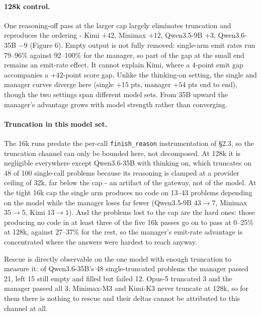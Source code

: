 \documentclass[11pt]{article}
\begin{document}


\paragraph{128k control.}
One reasoning-off pass at the larger cap largely eliminates truncation and reproduces the
ordering - Kimi $+42$, Minimax $+12$, Qwen3.5-9B $+3$, Qwen3.6-35B $-9$ (Figure 6).
Empty output is not fully removed: single-arm emit rates run 79--96\% against 92--100\%
for the manager, so part of the gap at the small end remains an emit-rate effect. It
cannot explain Kimi, where a 4-point emit gap accompanies a $+42$-point score gap. Unlike
the thinking-on setting, the single and manager curves diverge here (single $+15$ pts,
manager $+54$ pts end to end), though the two settings span different model sets. From 35B
upward the manager's advantage grows with model strength rather than converging.



\paragraph{Truncation in this model set.}
The 16k runs predate the per-call \texttt{finish\_reason} instrumentation of \S2.3, so the
truncation channel can only be bounded here, not decomposed. At 128k it is negligible
everywhere
except Qwen3.6-35B with thinking on, which truncates on 48 of 100 single-call
problems because its reasoning is clamped at a provider ceiling of 32k, far below the cap -
an artifact of the gateway, not of the model. At the tight 16k cap the single arm produces
no code on 13--43 problems depending on the model while the manager loses far fewer
(Qwen3.5-9B $43 \to 7$, Minimax $35 \to 5$, Kimi $13 \to 1$). And the problems lost to the
cap are the hard ones: those producing no code in at least three of the five 16k passes go
on to pass at 0--25\% at 128k, against 27--37\% for the rest, so the manager's emit-rate
advantage is concentrated where the answers were hardest to reach anyway.

Rescue is directly observable on the one model with enough truncation to measure it: of
Qwen3.6-35B's 48 single-truncated problems the manager passed 21, left 15 still empty and
filled but failed 12. Opus-5 truncated 3 and the manager passed all 3; Minimax-M3 and
Kimi-K3 never truncate at 128k, so for them there is nothing to rescue and their deltas
cannot be attributed to this channel at all.
\end{document}
